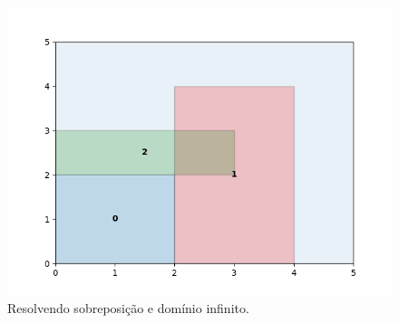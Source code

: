 \begin{figure}[!htb]
    \centering
    \includegraphics[scale=0.5]{utils/images/continuous_example2}
    \caption{Resolvendo sobreposição e domínio infinito.}
    \label{fig:sobreposicao-dominio2}
\end{figure}

